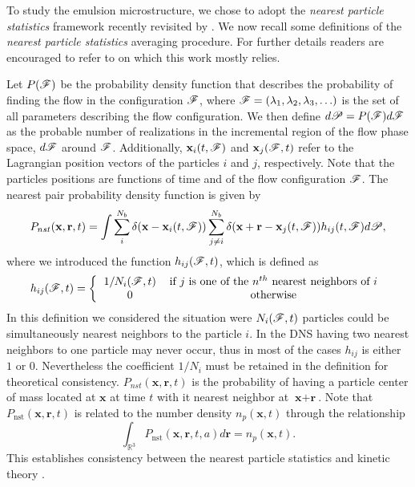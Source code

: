 
To study the emulsion microstructure, we chose to adopt the \textit{nearest particle statistics} framework recently revisited by \citet{zhang2021ensemble}.
We now recall some definitions of the \textit{nearest particle statistics} averaging procedure. 
For further details readers are encouraged to refer to \citet{zhang2021ensemble,zhang2023evolution} on which this work mostly relies.

Let $P(\mathscr{F})$ be the probability density function that describes the probability of finding the flow in the configuration $\mathscr{F}$, where $\mathscr{F} = (\lambda_1,\lambda_2,\lambda_3,\ldots)$ is the set of all parameters describing the flow configuration.
We then define $d\mathscr{P} = P(\mathscr{F})d\mathscr{F}$ as the probable number of realizations in the incremental region of the flow phase space, $d\mathscr{F}$ around $\mathscr{F}$.
Additionally,  $\textbf{x}_i(t,\mathscr{F})$ and $\textbf{x}_j(\mathscr{F},t)$ refer to the Lagrangian position vectors of the particles $i$ and $j$, respectively. 
Note that the particles positions are functions of time and of the flow configuration $\mathscr{F}$. 
The nearest pair probability density function is given by \citep{zhang2021ensemble,zhang2023evolution}
\begin{equation}
    P_{nst}(\textbf{x},\textbf{r},t)= 
    \int \sum_{i}^{N_b}\delta(\textbf{x}-\textbf{x}_i(t,\mathscr{F}))
    \sum_{j\neq i}^{N_b}\delta(\textbf{x}+\textbf{r}-\textbf{x}_j(t,\mathscr{F})) 
    h_{ij} (t,\mathscr{F})
    d\mathscr{P},
    \label{eq:P_nstij}
\end{equation}
where we introduced the function $h_{ij}(\mathscr{F},t)$, which is defined as
\begin{equation*}
    h_{ij}(\FF,t)
    = \left\{
        \begin{tabular}{cc}
            $1/N_i(\FF,t)$ & if $j$ is one of the $n^{th}$ nearest neighbors of $i$ \\
            0& otherwise
        \end{tabular}
        \right.
\end{equation*}
In this definition we considered the situation were $N_i(\mathscr{F},t)$ particles could be simultaneously nearest neighbors to the particle $i$. 
In the DNS having two nearest neighbors to one particle may never occur, thus in most of the cases $h_{ij}$ is either $1$ or $0$. 
Nevertheless the coefficient $1/N_i$ must be retained in the definition for theoretical consistency.
$P_{nst}(\textbf{x},\textbf{r},t)$ is the probability of having a particle center of mass located at $\textbf{x}$ at time $t$ with it nearest neighbor at $\textbf{x}+\textbf{r}$. 
Note that $P_\text{nst}(\textbf{x},\textbf{r},t)$ is related to the number density $n_p(\textbf{x},t)$ through the relationship
\begin{equation*}
    \int_{\mathbb{R}^3}
     P_\text{nst}(\textbf{x},\textbf{r},t,a) d\textbf{r}  = n_p(\textbf{x},t). 
    \label{eq:Pnst}
\end{equation*}
This establishes consistency between the nearest particle statistics and kinetic theory \citep{zhang2021ensemble}. 


